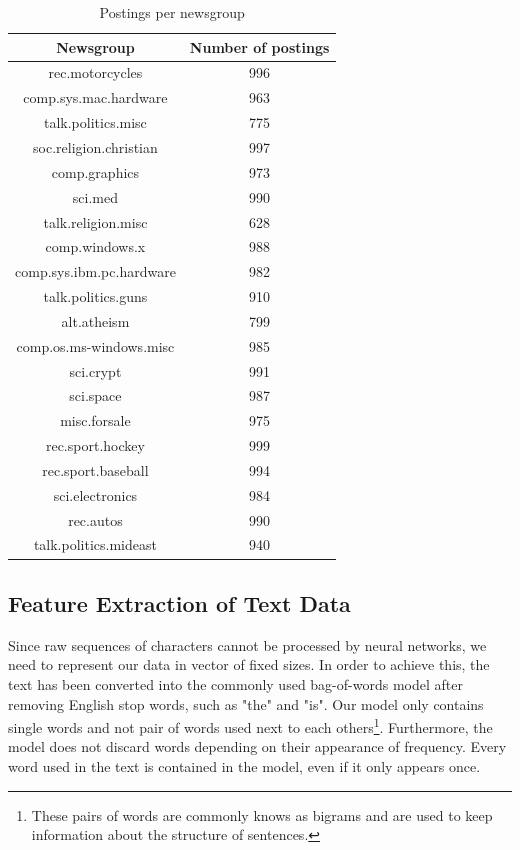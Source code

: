 \documentclass[sigconf]{acmart}
\begin{document}
\begin{table}[]
	\centering
	\caption{Postings per newsgroup}
	\label{tab:groups}
	\begin{tabular}{c|c}
		\hline
		       Newsgroup         & Number of postings \\ \hline
		    rec.motorcycles      &        996         \\
		 comp.sys.mac.hardware   &        963         \\
		   talk.politics.misc    &        775         \\
		 soc.religion.christian  &        997         \\
		     comp.graphics       &        973         \\
		        sci.med          &        990         \\
		   talk.religion.misc    &        628         \\
		     comp.windows.x      &        988         \\
		comp.sys.ibm.pc.hardware &        982         \\
		   talk.politics.guns    &        910         \\
		      alt.atheism        &        799         \\
		comp.os.ms-windows.misc  &        985         \\
		       sci.crypt         &        991         \\
		       sci.space         &        987         \\
		      misc.forsale       &        975         \\
		    rec.sport.hockey     &        999         \\
		   rec.sport.baseball    &        994         \\
		    sci.electronics      &        984         \\
		       rec.autos         &        990         \\
		 talk.politics.mideast   &        940
	\end{tabular}
\end{table}

\subsection{Feature Extraction of Text Data}

Since raw sequences of characters cannot be processed by neural networks, we need to represent our data in vector of fixed sizes. In order to achieve this, the text has been converted into the commonly used bag-of-words model after removing English stop words, such as "the" and "is". Our model only contains single words and not pair of words used next to each others\footnote{These pairs of words are commonly knows as bigrams and are used to keep information about the structure of sentences.}. Furthermore, the model does not discard words depending on their appearance of frequency. Every word used in the text is contained in the model, even if it only appears once.
\end{document}
